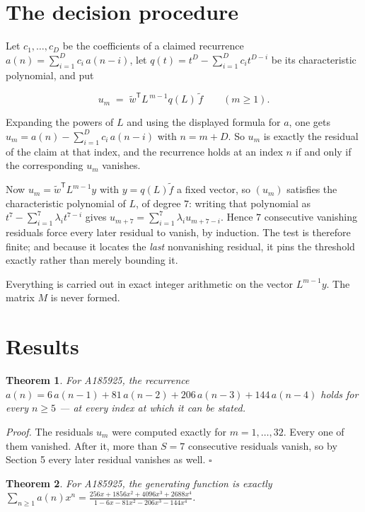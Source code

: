 \documentclass[11pt]{article}
\newtheorem{theorem}{Theorem}
\theoremstyle{definition}
\begin{document}
\section{The decision procedure}

Let $c_1,\dots,c_D$ be the coefficients of a claimed recurrence $a(n) = \sum_{i=1}^{D} c_i\,a(n-i)$, let $q(t) = t^{D} - \sum_{i=1}^{D} c_i t^{D-i}$ be its characteristic polynomial, and put

\[u_m \;=\; \tilde w^{\mathsf T} L^{\,m-1} q(L)\,\tilde f \qquad (m \ge 1).\]

Expanding the powers of $L$ and using the displayed formula for $a$, one gets $u_m = a(n) - \sum_{i=1}^{D} c_i\,a(n-i)$ with $n = m + D$. So $u_m$ is exactly the residual of the claim at that index, and the recurrence holds at an index $n$ if and only if the corresponding $u_m$ vanishes.

Now $u_m = \tilde w^{\mathsf T} L^{m-1} y$ with $y = q(L)\tilde f$ a fixed vector, so $(u_m)$ satisfies the characteristic polynomial of $L$, of degree $7$: writing that polynomial as $t^{7} - \sum_{i=1}^{7} \lambda_i t^{7-i}$ gives $u_{m+7} = \sum_{i=1}^{7} \lambda_i u_{m+7-i}$. Hence $7$ consecutive vanishing residuals force every later residual to vanish, by induction. The test is therefore finite; and because it locates the {\itshape last} nonvanishing residual, it pins the threshold exactly rather than merely bounding it.

Everything is carried out in exact integer arithmetic on the vector $L^{m-1}y$. The matrix $M$ is never formed.

\section{Results}

\begin{theorem} For A185925, the recurrence $a(n) = 6\,a(n-1) + 81\,a(n-2) + 206\,a(n-3) + 144\,a(n-4)$ holds for every $n \ge 5$ --- at every index at which it can be stated.\end{theorem}

{\itshape Proof.} The residuals $u_m$ were computed exactly for $m = 1,\dots,32$. Every one of them vanished. After it, more than $S = 7$ consecutive residuals vanish, so by Section 5 every later residual vanishes as well. $\square$

\begin{theorem} For A185925, the generating function is exactly $\sum_{n\ge 1} a(n)x^n = \frac{256x + 1856x^{2} + 4096x^{3} + 2688x^{4}}{1 - 6x - 81x^{2} - 206x^{3} - 144x^{4}}$.\end{theorem}
\end{document}
